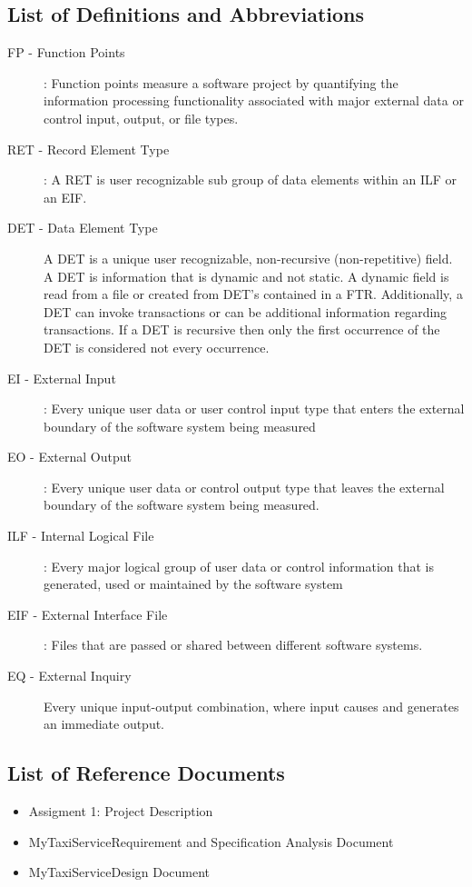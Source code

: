 \documentclass[11pt, a4paper,titlepage]{article}
\newcommand{\productname}{MyTaxiService}
\begin{document}
	\subsection{List of Definitions and Abbreviations}
	\begin{description}
		\item[FP - Function Points]: Function points measure a software project by quantifying the information processing functionality associated with major external data or control input, output, or file types. 
		\item[RET - Record Element Type]: A RET is user recognizable sub group of data elements within an ILF or an EIF.
		\item[DET - Data Element Type] A DET is a unique user recognizable, non-recursive (non-repetitive) field. A DET is information that is dynamic and not static. A dynamic field is read from a file or created from DET’s contained in a FTR. Additionally, a DET can invoke transactions or can be additional information regarding transactions. If a DET is recursive then only the first occurrence of the DET is considered not every occurrence.
		\item[EI - External Input]: Every unique user data or user control input type that enters the external boundary of the software system being measured
		\item[EO - External Output]: Every unique user data or control output type that leaves the external
		boundary of the software system being measured. 
		\item[ILF - Internal Logical File]: Every major logical group of user data or control information that is generated, used or maintained by the software system
		\item[EIF - External Interface File]: Files that are passed or shared between different software systems.
		\item[EQ - External Inquiry] Every unique input-output combination, where input causes and generates an immediate output.
	\end{description}
	\subsection{List of Reference Documents}
	\begin{itemize}
		\item Assigment 1: Project Description
		\item \productname Requirement and Specification Analysis Document
		\item \productname Design Document
	\end{itemize}
	\newpage
\end{document}
